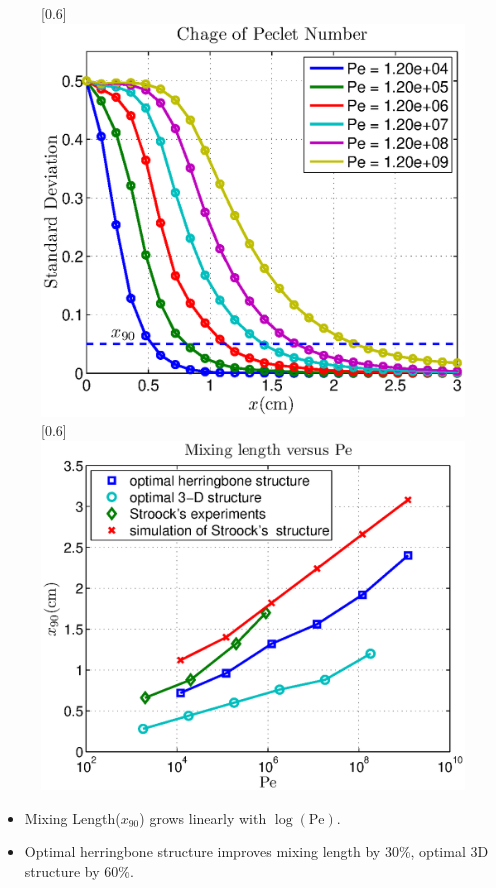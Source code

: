 \documentclass[dvips,landscape]{foils}
\begin{document}
  \begin{figure}
    \centerline{
       \scalebox{0.6}[0.6]{\includegraphics{example2veryPe2}}
       \scalebox{0.6}[0.6]{\includegraphics{example2mixinglength2}}
    }
  \end{figure}
\begin{itemize}\setlength{\parskip}{0pt}  \setlength{\itemsep}{10pt} \setlength{\topsep}{0pt}
\item Mixing Length($x_{90}$) grows linearly with $\log(\text{Pe})$.
\item Optimal herringbone structure improves mixing length by 30\%,
    optimal 3D structure by 60\%.
\end{itemize}
\end{document}

